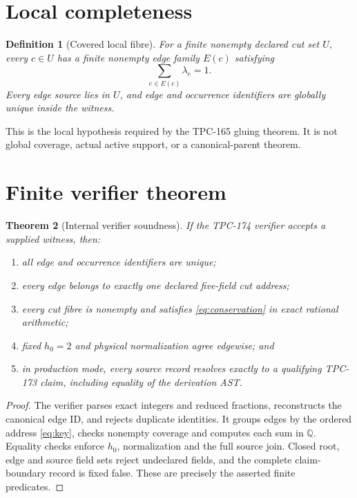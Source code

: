 \documentclass[11pt]{article}
\newtheorem{theorem}{Theorem}[section]
\newtheorem{definition}[theorem]{Definition}
\begin{document}
\section{Local completeness}

\begin{definition}[Covered local fibre]\label{def:fibre}
For a finite nonempty declared cut set \(U\), every \(c\in U\) has a finite
nonempty edge family \(E(c)\) satisfying
\[
 \sum_{e\in E(c)}\lambda_e=1.
\tag{3}\label{eq:conservation}
\]
Every edge source lies in \(U\), and edge and occurrence identifiers are
globally unique inside the witness.
\end{definition}

This is the local hypothesis required by the TPC-165 gluing theorem.  It is
not global coverage, actual active support, or a canonical-parent theorem.

\section{Finite verifier theorem}

\begin{theorem}[Internal verifier soundness]\label{thm:soundness}
If the TPC-174 verifier accepts a supplied witness, then:
\begin{enumerate}
\item all edge and occurrence identifiers are unique;
\item every edge belongs to exactly one declared five-field cut address;
\item every cut fibre is nonempty and satisfies
 \eqref{eq:conservation} in exact rational arithmetic;
\item fixed \(h_0=2\) and physical normalization agree edgewise; and
\item in production mode, every source record resolves exactly to a
 qualifying TPC-173 claim, including equality of the derivation AST.
\end{enumerate}
\end{theorem}

\begin{proof}
The verifier parses exact integers and reduced fractions, reconstructs the
canonical edge ID, and rejects duplicate identities.  It groups edges by the
ordered address \eqref{eq:key}, checks nonempty coverage and computes each
sum in \(\mathbb Q\).  Equality checks enforce \(h_0\), normalization and
the full source join.  Closed root, edge and source field sets reject
undeclared fields, and the complete claim-boundary record is fixed false.
These are precisely the asserted finite predicates.
\end{proof}
\end{document}
